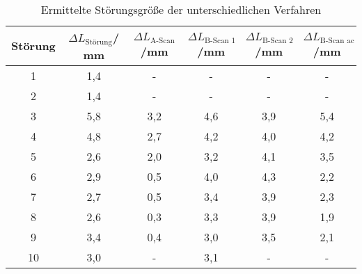 \begin{table}[h!]
  \centering
  \caption{Ermittelte Störungsgröße der unterschiedlichen Verfahren}
  \label{tab:disk}
  \begin{tabular}{c c c c c c}
    \toprule
      Störung & $\Delta L_{\text{Störung}}$/ mm &$\Delta L_{\text{A-Scan}}$/mm &$\Delta L_{\text{B-Scan 1}}$/mm &$\Delta L_{\text{B-Scan 2}}$/mm & $\Delta L_{\text{B-Scan ac}}$/mm\\
    \midrule
1  & 1,4  & -   & -     & -   & -   \\
2  & 1,4  & -   & -     & -   & -   \\
3  & 5,8  & 3,2 & 4,6   & 3,9 & 5,4 \\
4  & 4,8  & 2,7 & 4,2   & 4,0 & 4,2 \\
5  & 2,6  & 2,0 & 3,2   & 4,1 & 3,5 \\
6  & 2,9  & 0,5 & 4,0   & 4,3 & 2,2 \\
7  & 2,7  & 0,5 & 3,4   & 3,9 & 2,3 \\
8  & 2,6  & 0,3 & 3,3   & 3,9 & 1,9 \\
9  & 3,4  & 0,4 & 3,0   & 3,5 & 2,1 \\
10 & 3,0  & -   & 3,1  & -   & -   \\
    \bottomrule
  \end{tabular}
\end{table}

